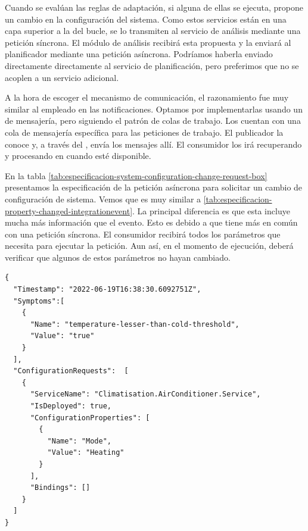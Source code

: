Cuando se evalúan las reglas de adaptación, si alguna de ellas se ejecuta, propone un cambio en la configuración del sistema. Como estos servicios están en una capa superior a la del bucle, se lo transmiten al servicio de análisis mediante una petición síncrona. El módulo de análisis recibirá esta propuesta y la enviará al planificador mediante una petición asíncrona. Podríamos haberla enviado directamente directamente al servicio de planificación, pero preferimos que no se acoplen a un servicio adicional.

A la hora de escoger el mecanismo de comunicación, el razonamiento fue muy similar al empleado en las notificaciones. Optamos por implementarlas usando un  de mensajería, pero siguiendo el patrón de colas de trabajo. Los  cuentan con una cola de mensajería específica para las peticiones de trabajo. El publicador la conoce y, a través del  , envía los mensajes allí. El consumidor los irá recuperando y procesando en cuando esté disponible.

En la tabla \ref{tab:especificacion-system-configuration-change-request-box} presentamos la especificación de la petición asíncrona para solicitar un cambio de configuración de sistema. Vemos que es muy similar a \ref{tab:especificacion-property-changed-integrationevent}. La principal diferencia es que esta incluye mucha más información que el evento. Esto es debido a que tiene más en común con una petición síncrona. El consumidor recibirá todos los parámetros que necesita para ejecutar la petición. Aun así, en el momento de ejecución, deberá verificar que algunos de estos parámetros no hayan cambiado.

\newsavebox\systemconfigurationchangerequestbox
\begin{lrbox}{\systemconfigurationchangerequestbox}
  \begin{minipage}[t]{2in}
    \begin{verbatim}
{
  "Timestamp": "2022-06-19T16:38:30.6092751Z",
  "Symptoms":[
    {
      "Name": "temperature-lesser-than-cold-threshold",
      "Value": "true"
    }
  ],
  "ConfigurationRequests":  [
    {
      "ServiceName": "Climatisation.AirConditioner.Service",
      "IsDeployed": true,
      "ConfigurationProperties": [
        {
          "Name": "Mode",
          "Value": "Heating"
        }
      ],
      "Bindings": []
    }
  ]
}
        \end{verbatim}
  \end{minipage}
\end{lrbox}

